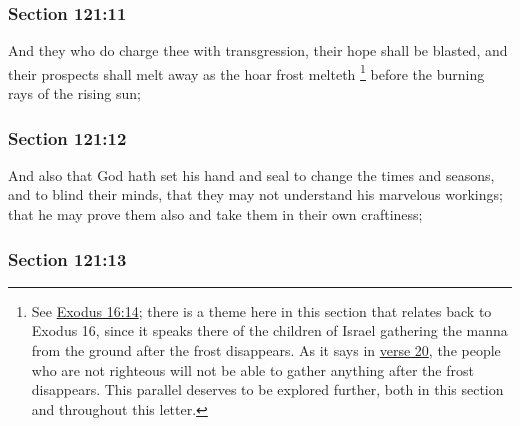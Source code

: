 	\subsubsection{Section 121:11} %
		\label{DC121-11}

		And they who do charge thee with transgression, their hope shall be blasted, and their prospects shall melt away as the hoar frost melteth%
			\footnote{%
				See \hyperref[EXODUS-16-14]{Exodus 16:14}; there is a theme here in this section that relates back to Exodus 16, since it speaks there of the children of Israel gathering the manna from the ground after the frost disappears. As it says in \hyperref[DC121-20]{verse 20}, the people who are not righteous will not be able to gather anything after the frost disappears. This parallel deserves to be explored further, both in this section and throughout this letter.
				}
		before the burning rays of the rising sun;


	\subsubsection{Section 121:12} %
		\label{DC121-12}

		And also that God hath set his hand and seal to change the times and seasons, and to blind their minds, that they may not understand his marvelous workings; that he may prove them also and take them in their own craftiness;


	\subsubsection{Section 121:13} %
		\label{DC121-13}

